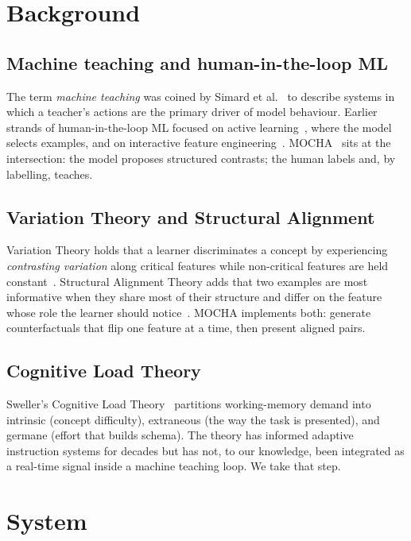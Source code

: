 \documentclass[sigchi, anonymous=true, review=true]{acmart}
\begin{document}
\section{Background}

\subsection{Machine teaching and human-in-the-loop ML}

The term \emph{machine teaching} was coined by Simard et
al.~\cite{simard2017machine} to describe systems in which a teacher's actions
are the primary driver of model behaviour. Earlier strands of human-in-the-loop
ML focused on active learning~\cite{settles2009active}, where the model
selects examples, and on interactive feature engineering~\cite{kulesza2015principles}.
MOCHA~\cite{gebreegziabher2024mocha} sits at the intersection: the model
proposes structured contrasts; the human labels and, by labelling, teaches.

\subsection{Variation Theory and Structural Alignment}

Variation Theory holds that a learner discriminates a concept by experiencing
\emph{contrasting variation} along critical features while non-critical
features are held constant~\cite{marton2014necessary}. Structural Alignment
Theory adds that two examples are most informative when they share most of
their structure and differ on the feature whose role the learner should
notice~\cite{gentner2010structure}. MOCHA implements both: generate
counterfactuals that flip one feature at a time, then present aligned pairs.

\subsection{Cognitive Load Theory}

Sweller's Cognitive Load Theory~\cite{sweller1988cognitive} partitions
working-memory demand into intrinsic (concept difficulty), extraneous (the
way the task is presented), and germane (effort that builds schema). The
theory has informed adaptive instruction systems for decades but has not, to
our knowledge, been integrated as a real-time signal inside a machine
teaching loop. We take that step.

\section{System}
\end{document}
